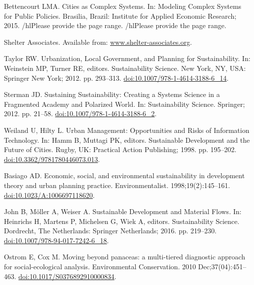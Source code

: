 \documentclass[10pt,a4paper]{article}
\begin{document}
\begin{multicols}{2}
\begin{footnotesize}
\begin{thebibliography}{100}
Bettencourt LMA.
\newblock Cities as {Complex} {Systems}.
\newblock In: Modeling {Complex} {Systems} for {Public} {Policies}. Brasilia,
  Brazil: Institute for Applied Economic Research; 2015. /hl{Please provide the
  page range}.
\newblock /hl{Please provide the page range}.

Shelter Associates.
\newblock Available from: \url{www.shelter-associates.org}.

Taylor RW.
\newblock Urbanization, {Local} {Government}, and {Planning} for
  {Sustainability}.
\newblock In: Weinstein MP, Turner RE, editors. Sustainability {Science}. New
  York, NY, USA: Springer New York; 2012. pp. 293--313.
\newblock
  \href{https://doi.org/10.1007/978-1-4614-3188-6\_14}{doi:10.1007/978-1-4614-3188-6\_14}.

Sterman JD.
\newblock Sustaining Sustainability: Creating a Systems Science in a Fragmented
  Academy and Polarized World.
\newblock In: Sustainability Science. Springer; 2012. pp. 21--58.
\newblock
  \href{https://doi.org/10.1007/978-1-4614-3188-6\_2}{doi:10.1007/978-1-4614-3188-6\_2}.

Weiland U, Hilty L.
 {Urban} {Management}: {Opportunities} and {Risks} of
  {Information} {Technology}.
\newblock In: Hamm B, Muttagi PK, editors. Sustainable {Development} and the
  {Future} of {Cities}. Rugby, UK: Practical Action Publishing; 1998. pp.
  195--202.
\newblock
  \href{https://doi.org/10.3362/9781780446073.013}{doi:10.3362/9781780446073.013}.

Basiago AD.
\newblock Economic, social, and environmental sustainability in development
  theory and urban planning practice.
\newblock Environmentalist. 1998;19(2):145--161.
\newblock
  \href{https://doi.org/10.1023/A:1006697118620}{doi:10.1023/A:1006697118620}.

John B, Möller A, Weiser A.
\newblock Sustainable {Development} and {Material} {Flows}.
\newblock In: Heinrichs H, Martens P, Michelsen G, Wiek A, editors.
  Sustainability {Science}. Dordrecht, The Netherlands: Springer Netherlands;
  2016. pp. 219--230.
\newblock
  \href{https://doi.org/10.1007/978-94-017-7242-6\_18}{doi:10.1007/978-94-017-7242-6\_18}.

Ostrom E, Cox M.
\newblock Moving beyond panaceas: a multi-tiered diagnostic approach for
  social-ecological analysis.
\newblock Environmental Conservation. 2010 Dec;37(04):451--463.
\newblock
  \href{https://doi.org/10.1017/S0376892910000834}{doi:10.1017/S0376892910000834}.


\end{thebibliography}
\end{footnotesize}
\end{multicols}
\end{document}
